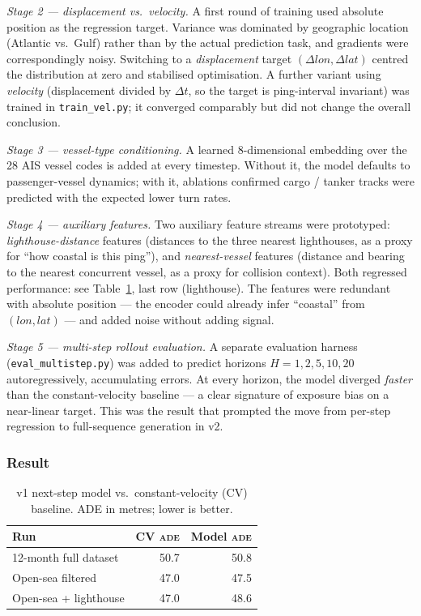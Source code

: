 \documentclass[11pt,a4paper]{article}
\newcommand{\ade}{\textsc{ade}}
\begin{document}
\textit{Stage 2 --- displacement vs.\ velocity.}
A first round of training used absolute position as the regression target.
Variance was dominated by geographic location (Atlantic vs.\ Gulf) rather
than by the actual prediction task, and gradients were correspondingly
noisy.  Switching to a \emph{displacement} target $(\Delta lon, \Delta lat)$
centred the distribution at zero and stabilised optimisation.  A further
variant using \emph{velocity} (displacement divided by $\Delta t$, so the
target is ping-interval invariant) was trained in \texttt{train\_vel.py};
it converged comparably but did not change the overall conclusion.

\textit{Stage 3 --- vessel-type conditioning.}
A learned 8-dimensional embedding over the 28 AIS vessel codes is added at
every timestep.  Without it, the model defaults to passenger-vessel
dynamics; with it, ablations confirmed cargo / tanker tracks were predicted
with the expected lower turn rates.

\textit{Stage 4 --- auxiliary features.}
Two auxiliary feature streams were prototyped: \emph{lighthouse-distance}
features (distances to the three nearest lighthouses, as a proxy for
``how coastal is this ping''), and \emph{nearest-vessel} features (distance
and bearing to the nearest concurrent vessel, as a proxy for collision
context).  Both regressed performance: see Table~\ref{tab:v1}, last row
(lighthouse).  The features were redundant with absolute position --- the
encoder could already infer ``coastal'' from $(lon, lat)$ --- and added
noise without adding signal.

\textit{Stage 5 --- multi-step rollout evaluation.}
A separate evaluation harness (\texttt{eval\_multistep.py}) was added to
predict horizons $H = 1, 2, 5, 10, 20$ autoregressively, accumulating
errors.  At every horizon, the model diverged \emph{faster} than the
constant-velocity baseline --- a clear signature of exposure bias on a near-linear
target.  This was the result that prompted the move from per-step
regression to full-sequence generation in v2.

\subsubsection{Result}

\begin{table}[ht]
\centering
\caption{v1 next-step model vs.\ constant-velocity (CV) baseline.
         ADE in metres; lower is better.}
\label{tab:v1}
\begin{tabular}{lrr}
\toprule
Run & CV \ade{} & Model \ade{} \\
\midrule
12-month full dataset    & 50.7 & 50.8 \\
Open-sea filtered        & 47.0 & 47.5 \\
Open-sea + lighthouse    & 47.0 & 48.6 \\
\bottomrule
\end{tabular}
\end{table}
\end{document}

